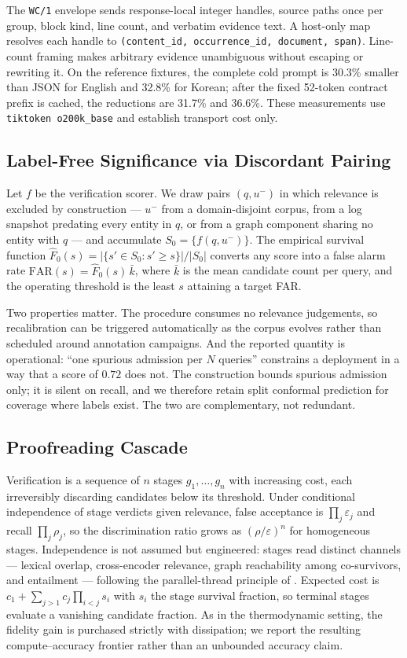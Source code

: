 The \texttt{WC/1} envelope sends response-local integer handles, source paths
once per group, block kind, line count, and verbatim evidence text. A host-only
map resolves each handle to
\texttt{(content\_id, occurrence\_id, document, span)}. Line-count framing
makes arbitrary evidence unambiguous without escaping or rewriting it. On the
reference fixtures, the complete cold prompt is 30.3\% smaller than JSON for
English and 32.8\% for Korean; after the fixed 52-token contract prefix is
cached, the reductions are 31.7\% and 36.6\%. These measurements use
\texttt{tiktoken o200k\_base} and establish transport cost only.

\subsection{Label-Free Significance via Discordant Pairing}
\label{sec:paper:far}
Let $f$ be the verification scorer. We draw pairs $(q, u^-)$ in which relevance is excluded by construction --- $u^-$ from a domain-disjoint corpus, from a log snapshot predating every entity in $q$, or from a graph component sharing no entity with $q$ --- and accumulate $S_0 = \{f(q,u^-)\}$. The empirical survival function $\hat{F}_0(s) = |\{s' \in S_0 : s' \ge s\}|/|S_0|$ converts any score into a false alarm rate $\text{FAR}(s) = \hat{F}_0(s)\,\bar{k}$, where $\bar{k}$ is the mean candidate count per query, and the operating threshold is the least $s$ attaining a target FAR.

Two properties matter. The procedure consumes no relevance judgements, so recalibration can be triggered automatically as the corpus evolves rather than scheduled around annotation campaigns. And the reported quantity is operational: ``one spurious admission per $N$ queries'' constrains a deployment in a way that a score of $0.72$ does not. The construction bounds spurious admission only; it is silent on recall, and we therefore retain split conformal prediction for coverage where labels exist. The two are complementary, not redundant.

\subsection{Proofreading Cascade}
\label{sec:paper:cascade}
Verification is a sequence of $n$ stages $g_1,\dots,g_n$ with increasing cost, each irreversibly discarding candidates below its threshold. Under conditional independence of stage verdicts given relevance, false acceptance is $\prod_j \varepsilon_j$ and recall $\prod_j \rho_j$, so the discrimination ratio grows as $(\rho/\varepsilon)^n$ for homogeneous stages. Independence is not assumed but engineered: stages read distinct channels --- lexical overlap, cross-encoder relevance, graph reachability among co-survivors, and entailment --- following the parallel-thread principle of \citet{kirby2025parallel}. Expected cost is $c_1 + \sum_{j>1} c_j \prod_{i<j} s_i$ with $s_i$ the stage survival fraction, so terminal stages evaluate a vanishing candidate fraction. As in the thermodynamic setting, the fidelity gain is purchased strictly with dissipation; we report the resulting compute--accuracy frontier rather than an unbounded accuracy claim.

